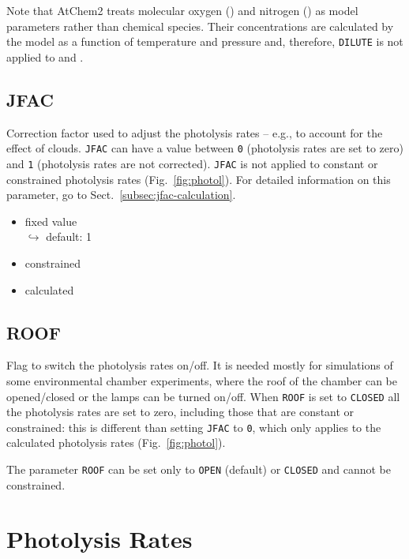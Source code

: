 Note that AtChem2 treats molecular oxygen () and nitrogen
() as model parameters rather than chemical species. Their
concentrations are calculated by the model as a function of
temperature and pressure and, therefore, \texttt{DILUTE} is not
applied to  and .

\subsection{JFAC} \label{subsec:jfac}

Correction factor used to adjust the photolysis rates -- e.g., to
account for the effect of clouds. \texttt{JFAC} can have a value
between \texttt{0} (photolysis rates are set to zero) and \texttt{1}
(photolysis rates are not corrected). \texttt{JFAC} is not applied to
constant or constrained photolysis rates (Fig.~\ref{fig:photol}). For
detailed information on this parameter, go to
Sect.~\ref{subsec:jfac-calculation}.

\begin{itemize}
\item fixed value\\$\hookrightarrow$ default: 1
\item constrained
\item calculated
\end{itemize}

\subsection{ROOF} \label{subsec:roof}

Flag to switch the photolysis rates on/off. It is needed mostly for
simulations of some environmental chamber experiments, where the roof
of the chamber can be opened/closed or the lamps can be turned on/off.
When \texttt{ROOF} is set to \texttt{CLOSED} all the photolysis rates
are set to zero, including those that are constant or constrained:
this is different than setting \texttt{JFAC} to \texttt{0}, which only
applies to the calculated photolysis rates (Fig.~\ref{fig:photol}).

The parameter \texttt{ROOF} can be set only to \texttt{OPEN} (default)
or \texttt{CLOSED} and cannot be constrained.

\section{Photolysis Rates} \label{sec:photolysis-rates}

